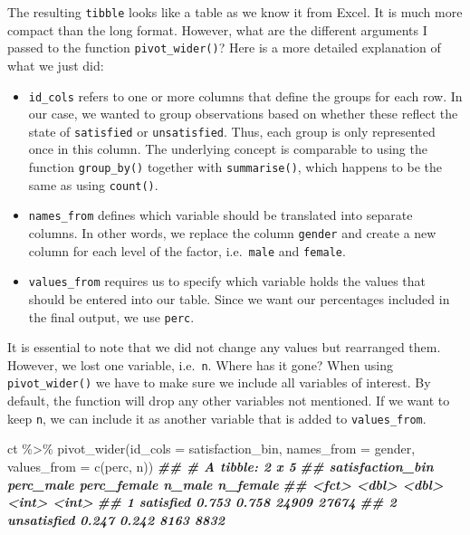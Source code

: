 \documentclass[
]{book}
\newenvironment{Shaded}{\begin{snugshade}}{\end{snugshade}}
\newcommand{\AttributeTok}[1]{\textcolor[rgb]{0.77,0.63,0.00}{#1}}
\newcommand{\DocumentationTok}[1]{\textcolor[rgb]{0.56,0.35,0.01}{\textbf{\textit{#1}}}}
\newcommand{\FunctionTok}[1]{\textcolor[rgb]{0.00,0.00,0.00}{#1}}
\newcommand{\NormalTok}[1]{#1}
\newcommand{\SpecialCharTok}[1]{\textcolor[rgb]{0.00,0.00,0.00}{#1}}
\begin{document}
The resulting \texttt{tibble} looks like a table as we know it from Excel. It is much more compact than the long format. However, what are the different arguments I passed to the function \texttt{pivot\_wider()}? Here is a more detailed explanation of what we just did:

\begin{itemize}
\item
  \texttt{id\_cols} refers to one or more columns that define the groups for each row. In our case, we wanted to group observations based on whether these reflect the state of \texttt{satisfied} or \texttt{unsatisfied}. Thus, each group is only represented once in this column. The underlying concept is comparable to using the function \texttt{group\_by()} together with \texttt{summarise()}, which happens to be the same as using \texttt{count()}.
\item
  \texttt{names\_from} defines which variable should be translated into separate columns. In other words, we replace the column \texttt{gender} and create a new column for each level of the factor, i.e.~\texttt{male} and \texttt{female}.
\item
  \texttt{values\_from} requires us to specify which variable holds the values that should be entered into our table. Since we want our percentages included in the final output, we use \texttt{perc}.
\end{itemize}

It is essential to note that we did not change any values but rearranged them. However, we lost one variable, i.e.~\texttt{n}. Where has it gone? When using \texttt{pivot\_wider()} we have to make sure we include all variables of interest. By default, the function will drop any other variables not mentioned. If we want to keep \texttt{n}, we can include it as another variable that is added to \texttt{values\_from}.

\begin{Shaded}
\begin{Highlighting}[]
\NormalTok{ct }\SpecialCharTok{\%\textgreater{}\%} \FunctionTok{pivot\_wider}\NormalTok{(}\AttributeTok{id\_cols =}\NormalTok{ satisfaction\_bin,}
                   \AttributeTok{names\_from =}\NormalTok{ gender,}
                   \AttributeTok{values\_from =} \FunctionTok{c}\NormalTok{(perc, n))}
\DocumentationTok{\#\# \# A tibble: 2 x 5}
\DocumentationTok{\#\#   satisfaction\_bin perc\_male perc\_female n\_male n\_female}
\DocumentationTok{\#\#   \textless{}fct\textgreater{}                \textless{}dbl\textgreater{}       \textless{}dbl\textgreater{}  \textless{}int\textgreater{}    \textless{}int\textgreater{}}
\DocumentationTok{\#\# 1 satisfied            0.753       0.758  24909    27674}
\DocumentationTok{\#\# 2 unsatisfied          0.247       0.242   8163     8832}
\end{Highlighting}
\end{Shaded}
\end{document}
